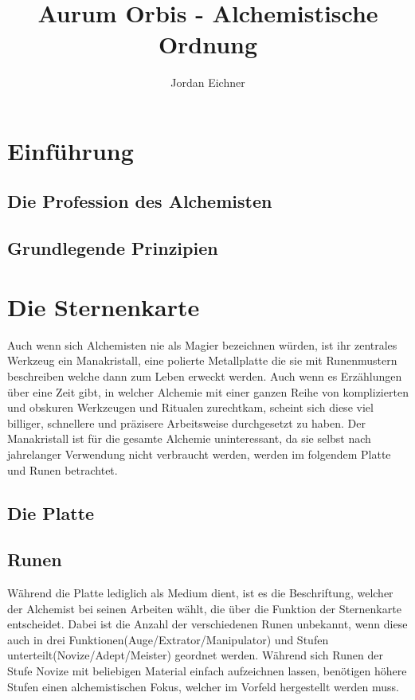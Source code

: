 \documentclass[a4paper,12pt,oneside]{book}
\title{Aurum Orbis - Alchemistische Ordnung}
\author{Jordan Eichner}
\date{}
\begin{document}
\maketitle
\tableofcontents

\part{Einführung}

\chapter{Die Profession des Alchemisten}

\chapter{Grundlegende Prinzipien}

\part{Die Sternenkarte}
Auch wenn sich Alchemisten nie als Magier bezeichnen würden, ist ihr zentrales Werkzeug ein Manakristall, eine polierte Metallplatte die sie mit Runenmustern beschreiben welche dann zum Leben erweckt werden. Auch wenn es Erzählungen über eine Zeit gibt, in welcher Alchemie mit einer ganzen Reihe von komplizierten und obskuren Werkzeugen und Ritualen zurechtkam, scheint sich diese viel billiger, schnellere und präzisere Arbeitsweise durchgesetzt zu haben. Der Manakristall ist für die gesamte Alchemie uninteressant, da sie selbst nach jahrelanger Verwendung nicht verbraucht werden, werden im folgendem Platte und Runen betrachtet.

\chapter{Die Platte}


\chapter{Runen}
Während die Platte lediglich als Medium dient, ist es die Beschriftung, welcher der Alchemist bei seinen Arbeiten wählt, die über die Funktion der Sternenkarte entscheidet. Dabei ist die Anzahl der verschiedenen Runen unbekannt, wenn diese auch in drei Funktionen(Auge/Extrator/Manipulator) und Stufen unterteilt(Novize/Adept/Meister) geordnet werden. Während sich Runen der Stufe Novize mit beliebigen Material einfach aufzeichnen lassen, benötigen höhere Stufen einen alchemistischen Fokus, welcher im Vorfeld hergestellt werden muss.
\end{document}
